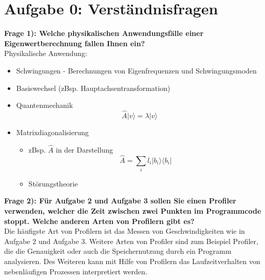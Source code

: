 \section*{Aufgabe 0: Verständnisfragen}

\textbf{Frage 1): Welche physikalischen Anwendungsfälle einer Eigenwertberechnung fallen Ihnen ein?}\\

Physikalische Anwendung:

\begin{itemize}
  \item Schwingungen - Berechnungen von Eigenfrequenzen und Schwingungsmoden
  \item Basiswechsel (zBsp. Hauptachsentransformation)
  \item Quantenmechanik
      \begin{equation*}
        \hat A |v\rangle=\lambda|v\rangle
      \end{equation*}
  \item Matrixdiagonalisierung
  \begin{itemize}
    \item zBsp. $\hat A$ in der Darstellung
    \begin{equation*}
      \hat A = \sum_{i} l_i |b_i\rangle \langle b_i |
    \end{equation*}
    \item Störungstheorie
  \end{itemize}
\end{itemize}

\textbf{Frage 2): Für Aufgabe 2 und Aufgabe 3 sollen Sie einen Profiler verwenden, welcher die Zeit zwischen zwei Punkten im Programmcode stoppt. Welche anderen Arten von Profilern gibt es?}\\


Die häufigste Art von Profilern ist das Messen von Geschwindigkeiten wie in Aufgabe 2 und Aufgabe 3.
Weitere Arten von Profiler sind zum Beispiel Profiler, die die Genauigkeit oder auch die Speichernutzung durch ein Programm analysieren.
Des Weiteren kann mit Hilfe von Profilern das Laufzeitverhalten von nebenläufigen Prozessen interpretiert werden.
